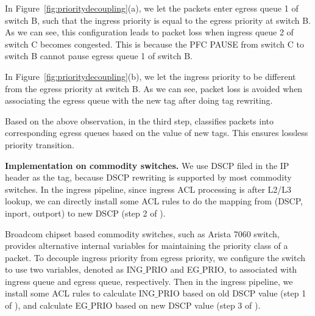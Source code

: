  In Figure~\ref{fig:prioritydecoupling}(a), we let the packets enter egress queue 1 of switch B, such that the ingress priority is equal to the egress priority at switch B. As we can see, this configuration leads to packet loss when ingress queue 2 of switch C becomes congested. This is because the PFC PAUSE from switch C to switch B cannot pause  egress queue 1 of switch B. 
 
 In Figure~\ref{fig:prioritydecoupling}(b), we let the ingress priority to be different from the egress priority at switch B. As we can see, packet loss is avoided when associating the egress queue with the new tag after doing tag rewriting.
 
 Based on the above observation, in the third step, \sysname{} classifies packets into corresponding egress queues based on the value of new tags. This ensures lossless priority transition.
 
 \textbf{\sysname{} Implementation on commodity switches.} We use DSCP filed in the IP header as the tag, because DSCP rewriting is supported by most commodity switches. In the ingress pipeline, since ingress ACL processing is after L2/L3 lookup, we can directly install some ACL rules to do the mapping from (DSCP, inport, outport) to new DSCP (step 2 of \sysname{}).
 
 Broadcom chipset based commodity switches, such as Arista 7060 switch, provides alternative internal variables for maintaining the priority class of a packet. To decouple ingress priority from  egress priority, we configure the switch to use two variables, denoted as ING$\_$PRIO and EG$\_$PRIO, to associated with ingress queue and egress queue, respectively. Then in the ingress pipeline, we install some ACL rules to calculate ING$\_$PRIO based on old DSCP value (step 1 of \sysname{}), and calculate EG$\_$PRIO based on new DSCP value (step 3 of \sysname{}).
  

%	
%	
%
%


